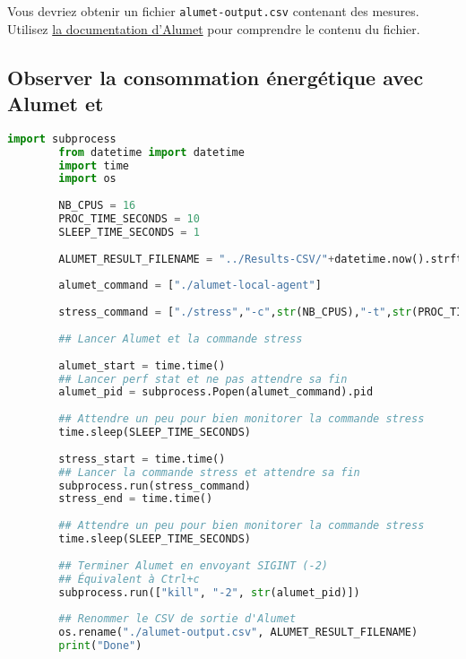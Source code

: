 \documentclass[a4paper,10pt]{article}
\begin{document}
Vous devriez obtenir un fichier \texttt{alumet-output.csv} contenant des mesures.
Utilisez
\href{https://alumet-dev.github.io/user-book/installation/exec.html}{la
documentation d'Alumet} pour comprendre le contenu du fichier.

\subsection{Observer la consommation énergétique avec Alumet et }

\begin{jupytercode}
    \begin{lstlisting}[language=Python]
        import subprocess
        from datetime import datetime
        import time
        import os
        
        NB_CPUS = 16
        PROC_TIME_SECONDS = 10
        SLEEP_TIME_SECONDS = 1
        
        ALUMET_RESULT_FILENAME = "../Results-CSV/"+datetime.now().strftime('%Y-%m-%d_%H:%M:%S')+"_alumet-output.csv"+".csv"
        
        alumet_command = ["./alumet-local-agent"]
        
        stress_command = ["./stress","-c",str(NB_CPUS),"-t",str(PROC_TIME_SECONDS)]
        
        ## Lancer Alumet et la commande stress
        
        alumet_start = time.time()
        ## Lancer perf stat et ne pas attendre sa fin
        alumet_pid = subprocess.Popen(alumet_command).pid
        
        ## Attendre un peu pour bien monitorer la commande stress
        time.sleep(SLEEP_TIME_SECONDS)    
        
        stress_start = time.time()
        ## Lancer la commande stress et attendre sa fin
        subprocess.run(stress_command)
        stress_end = time.time()
        
        ## Attendre un peu pour bien monitorer la commande stress
        time.sleep(SLEEP_TIME_SECONDS)
        
        ## Terminer Alumet en envoyant SIGINT (-2)
        ## Équivalent à Ctrl+c
        subprocess.run(["kill", "-2", str(alumet_pid)])
        
        ## Renommer le CSV de sortie d'Alumet
        os.rename("./alumet-output.csv", ALUMET_RESULT_FILENAME)
        print("Done")
    \end{lstlisting}
    \end{jupytercode}
\end{document}
